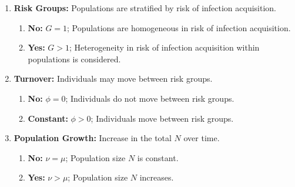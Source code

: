 \begin{fboxed}
  \begin{enumerate}[leftmargin=1em]
    \item\label{ass:risk-groups}\textbf{Risk Groups:}
    Populations are stratified by risk of infection acquisition.
    \begin{enumerate}
      \item\label{ass:risk-groups-no}\textbf{No:} $G = 1$;
      Populations are homogeneous in risk of infection acquisition.
      \item\label{ass:risk-groups-yes}\textbf{Yes:} $G > 1$;
      Heterogeneity in risk of infection acquisition within populations is considered.
    \end{enumerate}
    \item\label{ass:turnover}\textbf{Turnover:}
    Individuals may move between risk groups.
    \begin{enumerate}
      \item\textbf{No:} $\phi = 0$;
      Individuals do not move between risk groups.
      \item\textbf{Constant:} $\phi > 0$;
      Individuals move between risk groups. %
    \end{enumerate}
    \item\label{ass:pop-growth}\textbf{Population Growth:}
    Increase in the total $N$ over time.
    \begin{enumerate}
      \item\textbf{No:} $\nu = \mu$;
      Population size $N$ is constant.
      \item\textbf{Yes:} $\nu > \mu$;
      Population size $N$ increases. %
    \end{enumerate}
  \end{enumerate}
\end{fboxed}
